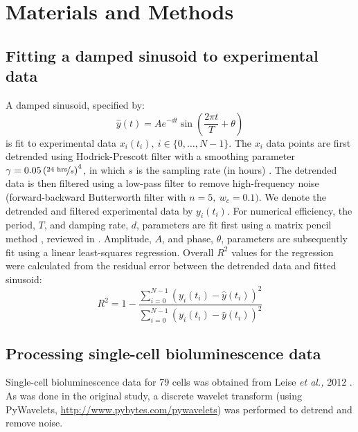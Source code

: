 \documentclass[11pt, letterpaper]{article}
\begin{document}
\section*{Materials and Methods}

\subsection*{Fitting a damped sinusoid to experimental data}
A damped sinusoid, specified by:
\[
  \hat{y}(t) = A e^{-d t} \sin\left(\frac{2\pi t}{T} + \theta\right)
\]
is fit to experimental data $x_i(t_i), \  i \in \{0, \dots, N-1\}$.
The $x_i$ data points are first detrended using Hodrick-Prescott filter with a smoothing parameter $\gamma = 0.05\left(\nicefrac{24 \text{ hrs}}{s}\right)^4$, in which $s$ is the sampling rate (in hours) \cite{Ravn2002}.
The detrended data is then filtered using a low-pass filter to remove high-frequency noise (forward-backward Butterworth filter with $n = 5,\ w_c = 0.1)$.
We denote the detrended and filtered experimental data by $y_i(t_i)$.
For numerical efficiency, the period, $T$, and damping rate, $d$, parameters are fit first using a matrix pencil method \cite{Hua1990}, reviewed in \cite{Zielinski2011}.
Amplitude, $A$, and phase, $\theta$, parameters are subsequently fit using a linear least-squares regression.
Overall $R^2$ values for the regression were calculated from the residual error between the detrended data and fitted sinusoid:
\[
  R^2 = 1 - \frac{\sum_{i = 0}^{N-1} (y_i(t_i) - \hat{y}(t_i))^2}{\sum_{i = 0}^{N-1} (y_i(t_i) - \bar{y}(t_i))^2}
\]


\subsection*{Processing single-cell bioluminescence data}

Single-cell bioluminescence data for 79 cells was obtained from Leise {\itshape et al.,} 2012 \cite{Leise2012}.
As was done in the original study, a discrete wavelet transform (using PyWavelets, \url{http://www.pybytes.com/pywavelets}) was performed to detrend and remove noise.
\end{document}
